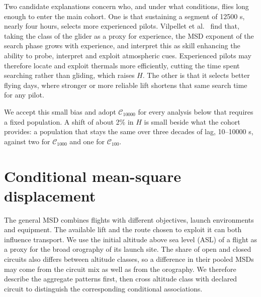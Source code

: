 Two candidate explanations concern who, and under what conditions, flies long
enough to enter the main cohort. One is that sustaining a segment of 12500 s,
nearly four hours, selects more experienced pilots. Vilpellet et al.~\cite{vilpellet2026} find that,
taking the class of the glider as a proxy for experience, the MSD exponent of the
search phase grows with experience, and interpret this as skill enhancing the
ability to probe, interpret and exploit atmospheric cues. Experienced pilots may
therefore locate and exploit thermals more efficiently, cutting the time spent
searching rather than gliding, which raises $H$. The other is that it
selects better flying days, where stronger or more reliable lift shortens that same
search time for any pilot.

We accept this small bias and adopt $\mathcal C_{10000}$ for every analysis below that
requires a fixed population. A shift of about 2\% in $H$ is small beside what the cohort
provides: a population that stays the same over three decades of lag, 10--10000 s,
against two for $\mathcal C_{1000}$ and one for $\mathcal C_{100}$.



\section{Conditional mean-square displacement}
\label{sec:fixed-circuit}

The general MSD combines flights with different objectives, launch environments
and equipment. The available lift and the route chosen to exploit it can both
influence transport. We use the initial altitude above sea level (ASL) of a
flight as a proxy for the broad orography of its launch site. The share of open
and closed circuits also differs between altitude classes, so a difference in their
pooled MSDs may come from the circuit mix as well as from the orography. We therefore describe the aggregate patterns first, then cross altitude
class with declared circuit to distinguish the corresponding conditional
associations.

